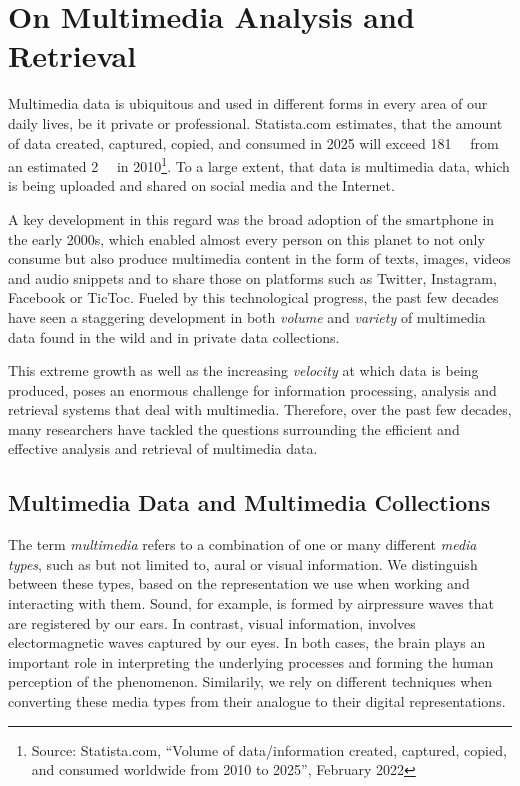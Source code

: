 \chapter{On Multimedia Analysis and Retrieval}
\label{chapter:theory_multimedia_analysis_and_retrieval}

Multimedia data is ubiquitous and used in different forms in every area of our daily lives, be it private or professional. Statista.com estimates, that the amount of data created, captured, copied, and consumed in 2025 will exceed \SI{181}{\zeta\byte} from an estimated \SI{2}{\zeta\byte} in 2010\footnote{Source: Statista.com, ``Volume of data/information created, captured, copied, and consumed worldwide from 2010 to 2025'', February 2022}. To a large extent, that data is multimedia data, which is being uploaded and shared on social media and the Internet.

A key development in this regard was the broad adoption of the smartphone in the early 2000s, which enabled almost every person on this planet to not only consume but also produce multimedia content in the form of texts, images, videos and audio snippets and to share those on platforms such as Twitter, Instagram, Facebook or TicToc. Fueled by this technological progress, the past few decades have seen a staggering development in both \emph{volume} and \emph{variety} of multimedia data found in the wild and in private data collections.

This extreme growth as well as the increasing \emph{velocity} at which data is being produced, poses an enormous challenge for information processing, analysis and retrieval systems that deal with multimedia. Therefore, over the past few decades, many researchers have tackled the questions surrounding the efficient and effective analysis and retrieval of multimedia data.

\section{Multimedia Data and Multimedia Collections}
\label{section:multmedia_data}

The term \emph{multimedia} refers to a combination of one or many different \emph{media types}, such as but not limited to, aural or visual information. We distinguish between these types, based on the representation we use when working and interacting with them. Sound, for example, is formed by airpressure waves that are registered by our ears. In contrast, visual information, involves electormagnetic waves captured by our eyes. In both cases, the brain plays an important role in interpreting the underlying processes and forming the human perception of the phenomenon. Similarily, we rely on different techniques when converting these media types from their analogue to their digital representations. 


